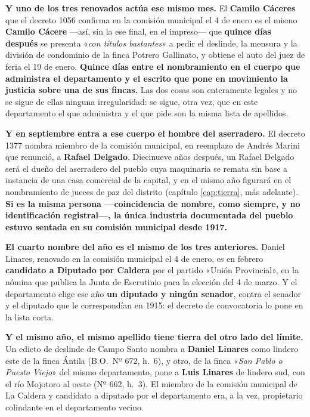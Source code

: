 \textbf{Y uno de los tres renovados actúa ese mismo mes.} El \textbf{Camilo Cáceres} que el decreto 1056 confirma en la comisión municipal el 4 de enero es el mismo \textbf{Camilo Cácere} ---así, sin la ese final, en el impreso--- que \textbf{quince días después} se presenta «\textit{con títulos bastantes}» a pedir el deslinde, la mensura y la división de condominio de la finca Potrero Gallinato, y obtiene el auto del juez de feria el 19 de enero. \textbf{Quince días entre el nombramiento en el cuerpo que administra el departamento y el escrito que pone en movimiento la justicia sobre una de sus fincas.} Las dos cosas son enteramente legales y no se sigue de ellas ninguna irregularidad: se sigue, otra vez, que en este departamento el que administra y el que pide son la misma lista de apellidos.

\textbf{Y en septiembre entra a ese cuerpo el hombre del aserradero.} El decreto 1377 nombra miembro
de la comisión municipal, en reemplazo de Andrés Marini que renunció, a \textbf{Rafael
Delgado}. Diecinueve años después, un Rafael Delgado será el dueño del
aserradero del pueblo cuya maquinaria se remata sin base a instancia de una casa comercial de la
capital, y en el mismo año figurará en el nombramiento de jueces de paz del distrito (capítulo
\ref{cap:tierra}, más adelante). \textbf{Si es la misma persona ---coincidencia de nombre, como siempre, y no
identificación registral---, la única industria documentada del pueblo estuvo sentada en su comisión
municipal desde 1917.}

\textbf{El cuarto nombre del año es el mismo de los tres anteriores.} Daniel
Linares, renovado en la comisión municipal el 4 de enero, es en febrero
\textbf{candidato a Diputado por Caldera} por el partido «Unión Provincial», en la nómina que publica
la Junta de Escrutinio para la elección del 4 de marzo. Y el departamento elige ese año \textbf{un
diputado y ningún senador}, contra el senador y el diputado que le correspondían en 1915: el decreto
de convocatoria lo pone en la lista corta.

\textbf{Y el mismo año, el mismo apellido tiene tierra del otro lado del límite.} Un edicto de deslinde de Campo Santo nombra a \textbf{Daniel Linares} como lindero este de la finca Ántila (B.O.\ Nº 672, h.\ 6), y otro, de la finca «\textit{San Pablo o Puesto Viejo}» del mismo departamento, pone a \textbf{Luis Linares} de lindero sud, con el río Mojotoro al oeste (Nº 662, h.\ 3). El miembro de la comisión municipal de La Caldera y candidato a diputado por el departamento era, a la vez, propietario colindante en el departamento vecino.


